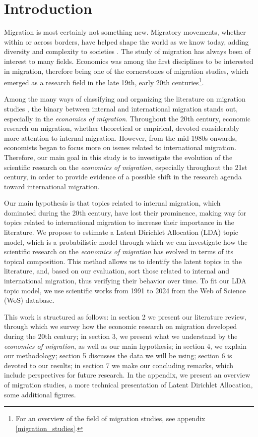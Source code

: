 \section{Introduction} \label{introduction}

Migration is most certainly not something new. Migratory movements, whether within or across borders, have helped shape the world as we know today, adding diversity and complexity to societies \citep{schrover_migration_2022}. The study of migration has always been of interest to many fields. Economics was among the first disciplines to be interested in migration, therefore being one of the cornerstones of migration studies, which emerged as a research field in the late 19th, early 20th centuries\footnote{For an overview of the field of migration studies, see appendix \ref{migration_studies}.}\citep{greenwood_early_2003, levy_between_2020, scholten_introduction_2022}. 

Among the many ways of classifying and organizing the literature on migration studies \citep{cohen_introduction_1996, king_towards_2002, king_mind_2010, king_theories_2012}, the binary between internal and international migration stands out, especially in the \textit{economics of migration}. Throughout the 20th century, economic research on migration, whether theoretical or empirical, devoted considerably more attention to internal migration. However, from the mid-1980s onwards, economists began to focus more on issues related to international migration. Therefore, our main goal in this study is to investigate the evolution of the scientific research on the \textit{economics of migration}, especially throughout the 21st century, in order to provide evidence of a possible shift in the research agenda toward international migration.

Our main hypothesis is that topics related to internal migration, which dominated during the 20th century, have lost their prominence, making way for topics related to international migration to increase their importance in the literature. We propose to estimate a Latent Dirichlet Allocation (LDA) topic model, which is a probabilistic model through which we can investigate how the scientific research on the \textit{economics of migration} has evolved in terms of its topical composition. This method allows us to identify the latent topics in the literature, and, based on our evaluation, sort those related to internal and international migration, thus verifying their behavior over time. To fit our LDA topic model, we use scientific works from 1991 to 2024 from the Web of Science (WoS) database.

This work is structured as follows: in section 2 we present our literature review, through which we survey how the economic research on migration developed during the 20th century; in section 3, we present what we understand by the \textit{economics of migration}, as well as our main hypothesis; in section 4, we explain our methodology; section 5 discusses the data we will be using; section 6 is devoted to our results; in section 7 we make our concluding remarks, which include perspectives for future research. In the appendix, we present an overview of migration studies, a more technical presentation of Latent Dirichlet Allocation, some additional figures.